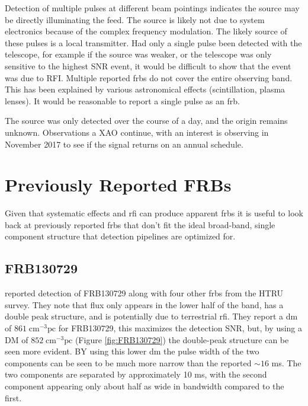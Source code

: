 \documentclass[a4paper,fleqn,usenatbib]{mnras}
\begin{document}
Detection of multiple pulses at different beam pointings indicates the source
may be directly illuminating the feed. The source is likely not due to system
electronics because of the complex frequency modulation. The likely source of
these pulses is a local transmitter. Had only a single pulse been detected with
the telescope, for example if the source was weaker, or the telescope was only
sensitive to the highest SNR event, it would be difficult to show that the event
was due to RFI. Multiple reported \glspl{frb} do not cover the entire observing
band. This has been explained by various astronomical effects (scintillation,
plasma lenses). It would be reasonable to report a single pulse as an \gls{frb}.

The source was only detected over the course of a day, and the origin remains
unknown.  Observations a XAO continue, with an interest is observing in November
2017 to see if the signal returns on an annual schedule.

\section{Previously Reported FRBs}
\label{sec:previous_frbs}

Given that systematic effects and \gls{rfi} can produce apparent \glspl{frb} it
is useful to look back at previously reported \glspl{frb} that don't fit the
ideal broad-band, single component structure that detection pipelines are
optimized for.

\subsection{FRB130729}

\cite{2016MNRAS.460L..30C} reported detection of FRB130729 along with four other
\glspl{frb} from the HTRU survey. They note that flux only appears in the lower
half of the band, has a double peak structure, and is potentially due to
terrestrial \gls{rfi}.  They report a \gls{dm} of $861 \; \textrm{cm}^{-3}
\textrm{pc}$ for FRB130729, this maximizes the detection SNR, but, by using a DM
of $852 \; \textrm{cm}^{-3} \textrm{pc}$ (Figure \ref{fig:FRB130729}) the
double-peak structure can be seen more evident. BY using this lower \gls{dm} the
pulse width of the two components can be seen to be much more narrow than the
reported $\sim16$ ms.  The two components are separated by approximately 10 ms,
with the second component appearing only about half as wide in bandwidth
compared to the first.
\end{document}
